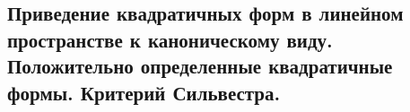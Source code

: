 \subsection{Приведение квадратичных форм в линейном пространстве к каноническому виду. Положительно определенные квадратичные формы. Критерий Сильвестра.}
